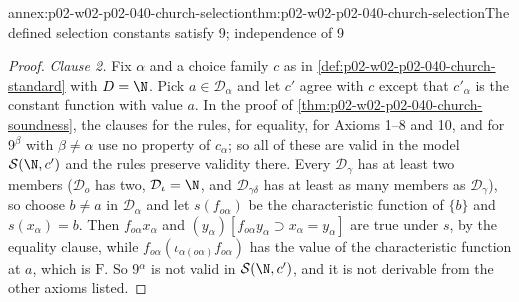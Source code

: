 \begin{annexitem}{annex:p02-w02-p02-040-church-selection}{thm:p02-w02-p02-040-church-selection}{The defined selection constants satisfy 9; independence of 9}
\begin{proof}
\emph{Clause 2.}  Fix \(\alpha\) and a choice family \(c\) as in
\cref{def:p02-w02-p02-040-church-standard} with \(D=\N\).  Pick
\(a\in\mathcal D_\alpha\) and let \(c'\) agree with \(c\) except that
\(c'_\alpha\) is the constant function with value \(a\).  In the proof of
\cref{thm:p02-w02-p02-040-church-soundness}, the clauses for the rules, for
equality, for Axioms 1--8 and 10, and for 9\(^\beta\) with \(\beta\neq\alpha\)
use no property of \(c_\alpha\); so all of these are valid in the model
\(\mathcal S(\N,c')\) and the rules preserve validity there.  Every
\(\mathcal D_\gamma\) has at least two members (\(\mathcal D_o\) has two,
\(\mathcal D_\iota=\N\), and \(\mathcal D_{\gamma\delta}\) has at least as many
members as \(\mathcal D_\gamma\)), so choose \(b\neq a\) in \(\mathcal D_\alpha\)
and let \(s(f_{o\alpha})\) be the characteristic function of \(\{b\}\) and
\(s(x_\alpha)=b\).  Then \(f_{o\alpha}x_\alpha\) and
\((y_\alpha)[f_{o\alpha}y_\alpha\supset x_\alpha=y_\alpha]\) are true under \(s\),
by the equality clause, while
\(f_{o\alpha}(\iota_{\alpha(o\alpha)}f_{o\alpha})\) has the value of the
characteristic function at \(a\), which is \(\mathrm F\).  So 9\(^\alpha\) is not
valid in \(\mathcal S(\N,c')\), and it is not derivable from the other axioms
listed.
\end{proof}
\end{annexitem}

